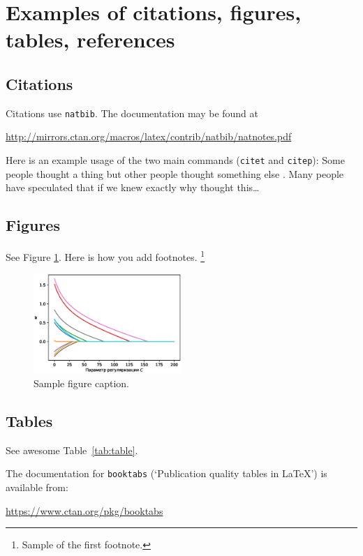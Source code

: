 \documentclass{article}
\begin{document}
\section{Examples of citations, figures, tables, references}
\label{sec:others}

\subsection{Citations}
Citations use \verb+natbib+. The documentation may be found at
\begin{center}
	\url{http://mirrors.ctan.org/macros/latex/contrib/natbib/natnotes.pdf}
\end{center}

Here is an example usage of the two main commands (\verb+citet+ and \verb+citep+): Some people thought a thing \citep{kour2014real, hadash2018estimate} but other people thought something else \citep{kour2014fast}. Many people have speculated that if we knew exactly why \citet{kour2014fast} thought this\dots

\subsection{Figures}
\lipsum[10]
See Figure \ref{fig:fig1}. Here is how you add footnotes. \footnote{Sample of the first footnote.}
\lipsum[11]

\begin{figure}
	\centering
	\includegraphics[width=0.5\textwidth]{../figures/log_reg_cs_exp.eps}
	\caption{Sample figure caption.}
	\label{fig:fig1}
\end{figure}

\subsection{Tables}
See awesome Table~\ref{tab:table}.

The documentation for \verb+booktabs+ (`Publication quality tables in LaTeX') is available from:
\begin{center}
	\url{https://www.ctan.org/pkg/booktabs}
\end{center}
\end{document}
